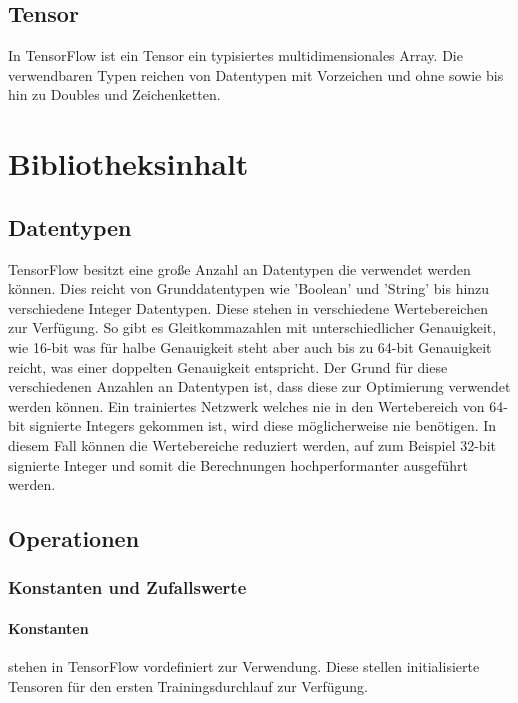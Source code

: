\subsection{Tensor}

In TensorFlow ist ein Tensor ein typisiertes multidimensionales Array. 
Die verwendbaren Typen reichen von Datentypen mit Vorzeichen und ohne sowie bis hin zu Doubles und Zeichenketten. \cite{wp2015tensorflow} 

\section{Bibliotheksinhalt}

\subsection{Datentypen}

TensorFlow besitzt eine große Anzahl an Datentypen die verwendet werden können. 
Dies reicht von Grunddatentypen wie 'Boolean' und 'String' bis hinzu verschiedene Integer Datentypen. 
Diese stehen in verschiedene Wertebereichen zur Verfügung. 
So gibt es Gleitkommazahlen mit unterschiedlicher Genauigkeit, wie 16-bit was für halbe Genauigkeit steht aber auch bis zu 64-bit Genauigkeit reicht, was einer doppelten Genauigkeit entspricht. 
Der Grund für diese verschiedenen Anzahlen an Datentypen ist, dass diese zur Optimierung verwendet werden können. 
Ein trainiertes Netzwerk welches nie in den Wertebereich von 64-bit signierte Integers gekommen ist, wird diese möglicherweise nie benötigen. 
In diesem Fall können die Wertebereiche reduziert werden, auf zum Beispiel 32-bit signierte Integer und somit die Berechnungen hochperformanter ausgeführt werden. \cite{TensorFlow}

\subsection{Operationen}

\subsubsection{Konstanten und Zufallswerte}

\paragraph{Konstanten} stehen in TensorFlow vordefiniert zur Verwendung.
Diese stellen initialisierte Tensoren für den ersten Trainingsdurchlauf zur Verfügung.

